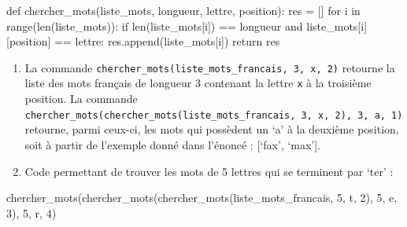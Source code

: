 \documentclass[
  letterpaper,
  DIV=11,
  numbers=noendperiod]{scrartcl}
\newenvironment{Shaded}{\begin{snugshade}}{\end{snugshade}}
\newcommand{\BuiltInTok}[1]{\textcolor[rgb]{0.00,0.23,0.31}{#1}}
\newcommand{\ControlFlowTok}[1]{\textcolor[rgb]{0.00,0.23,0.31}{#1}}
\newcommand{\DecValTok}[1]{\textcolor[rgb]{0.68,0.00,0.00}{#1}}
\newcommand{\KeywordTok}[1]{\textcolor[rgb]{0.00,0.23,0.31}{#1}}
\newcommand{\NormalTok}[1]{\textcolor[rgb]{0.00,0.23,0.31}{#1}}
\newcommand{\OperatorTok}[1]{\textcolor[rgb]{0.37,0.37,0.37}{#1}}
\newcommand{\StringTok}[1]{\textcolor[rgb]{0.13,0.47,0.30}{#1}}
\begin{document}
\begin{enumerate}
\begin{Shaded}
\begin{Highlighting}[]
\KeywordTok{def}\NormalTok{ chercher\_mots(liste\_mots, longueur, lettre, position):}
\NormalTok{    res }\OperatorTok{=}\NormalTok{ []}
    \ControlFlowTok{for}\NormalTok{ i }\KeywordTok{in} \BuiltInTok{range}\NormalTok{(}\BuiltInTok{len}\NormalTok{(liste\_mots)):}
        \ControlFlowTok{if} \BuiltInTok{len}\NormalTok{(liste\_mots[i]) }\OperatorTok{==}\NormalTok{ longueur }\KeywordTok{and}\NormalTok{ liste\_mots[i][position] }\OperatorTok{==}\NormalTok{ lettre:}
\NormalTok{            res.append(liste\_mots[i])}
    \ControlFlowTok{return}\NormalTok{ res}
\end{Highlighting}
\end{Shaded}

  \begin{enumerate}
  \def\labelenumii{\alph{enumii}.}
  \setcounter{enumii}{1}
  \item
    La commande
    \texttt{chercher\_mots(liste\_mots\_francais,\ 3,\ \textquotesingle{}x\textquotesingle{},\ 2)}
    retourne la liste des mots français de longueur 3 contenant la
    lettre \texttt{x} à la troisième position. La commande
    \texttt{chercher\_mots(chercher\_mots(liste\_mots\_francais,\ 3,\ \textquotesingle{}x\textquotesingle{},\ 2),\ 3,\ \textquotesingle{}a\textquotesingle{},\ 1)}
    retourne, parmi ceux-ci, les mots qui possèdent un `a' à la deuxième
    position, soit à partir de l'exemple donné dans l'énoncé : {[}`fax',
    `max'{]}.
  \item
    Code permettant de trouver les mots de 5 lettres qui se terminent
    par `ter' :
  \end{enumerate}

\begin{Shaded}
\begin{Highlighting}[]
\NormalTok{chercher\_mots(chercher\_mots(chercher\_mots(liste\_mots\_francais, }\DecValTok{5}\NormalTok{, }\StringTok{\textquotesingle{}t\textquotesingle{}}\NormalTok{, }\DecValTok{2}\NormalTok{), }\DecValTok{5}\NormalTok{, }\StringTok{\textquotesingle{}e\textquotesingle{}}\NormalTok{, }\DecValTok{3}\NormalTok{), }\DecValTok{5}\NormalTok{, }\StringTok{\textquotesingle{}r\textquotesingle{}}\NormalTok{, }\DecValTok{4}\NormalTok{)}
\end{Highlighting}
\end{Shaded}
\end{enumerate}
\end{document}
